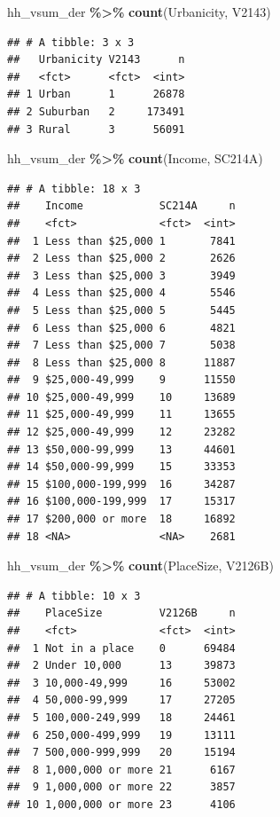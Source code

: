 \documentclass[
]{krantz}
\makeatletter
\newenvironment{Shaded}{\begin{snugshade}}{\end{snugshade}}
\newcommand{\FunctionTok}[1]{\textcolor[rgb]{0.27,0.27,0.27}{\textbf{#1}}}
\newcommand{\NormalTok}[1]{#1}
\newcommand{\SpecialCharTok}[1]{\textcolor[rgb]{0.43,0.43,0.43}{\textbf{#1}}}
\newenvironment{kframe}{%
\medskip{}
\setlength{\fboxsep}{.8em}
 \def\at@end@of@kframe{}%
 \ifinner\ifhmode%
  \def\at@end@of@kframe{\end{minipage}}%
  \begin{minipage}{\columnwidth}%
 \fi\fi%
 \def\FrameCommand##1{\hskip\@totalleftmargin \hskip-\fboxsep
 \colorbox{shadecolor}{##1}\hskip-\fboxsep
     \hskip-\linewidth \hskip-\@totalleftmargin \hskip\columnwidth}%
 \MakeFramed {\advance\hsize-\width
   \@totalleftmargin\z@ \linewidth\hsize
   \@setminipage}}%
 {\par\unskip\endMakeFramed%
 \at@end@of@kframe}
\renewenvironment{Shaded}{\begin{kframe}}{\end{kframe}}
\makeatother
\begin{document}
\begin{Shaded}
\begin{Highlighting}[]
\NormalTok{hh\_vsum\_der }\SpecialCharTok{\%\textgreater{}\%} \FunctionTok{count}\NormalTok{(Urbanicity, V2143)}
\end{Highlighting}
\end{Shaded}

\begin{verbatim}
## # A tibble: 3 x 3
##   Urbanicity V2143      n
##   <fct>      <fct>  <int>
## 1 Urban      1      26878
## 2 Suburban   2     173491
## 3 Rural      3      56091
\end{verbatim}

\begin{Shaded}
\begin{Highlighting}[]
\NormalTok{hh\_vsum\_der }\SpecialCharTok{\%\textgreater{}\%} \FunctionTok{count}\NormalTok{(Income, SC214A)}
\end{Highlighting}
\end{Shaded}

\begin{verbatim}
## # A tibble: 18 x 3
##    Income            SC214A     n
##    <fct>             <fct>  <int>
##  1 Less than $25,000 1       7841
##  2 Less than $25,000 2       2626
##  3 Less than $25,000 3       3949
##  4 Less than $25,000 4       5546
##  5 Less than $25,000 5       5445
##  6 Less than $25,000 6       4821
##  7 Less than $25,000 7       5038
##  8 Less than $25,000 8      11887
##  9 $25,000-49,999    9      11550
## 10 $25,000-49,999    10     13689
## 11 $25,000-49,999    11     13655
## 12 $25,000-49,999    12     23282
## 13 $50,000-99,999    13     44601
## 14 $50,000-99,999    15     33353
## 15 $100,000-199,999  16     34287
## 16 $100,000-199,999  17     15317
## 17 $200,000 or more  18     16892
## 18 <NA>              <NA>    2681
\end{verbatim}

\begin{Shaded}
\begin{Highlighting}[]
\NormalTok{hh\_vsum\_der }\SpecialCharTok{\%\textgreater{}\%} \FunctionTok{count}\NormalTok{(PlaceSize, V2126B)}
\end{Highlighting}
\end{Shaded}

\begin{verbatim}
## # A tibble: 10 x 3
##    PlaceSize         V2126B     n
##    <fct>             <fct>  <int>
##  1 Not in a place    0      69484
##  2 Under 10,000      13     39873
##  3 10,000-49,999     16     53002
##  4 50,000-99,999     17     27205
##  5 100,000-249,999   18     24461
##  6 250,000-499,999   19     13111
##  7 500,000-999,999   20     15194
##  8 1,000,000 or more 21      6167
##  9 1,000,000 or more 22      3857
## 10 1,000,000 or more 23      4106
\end{verbatim}
\end{document}
